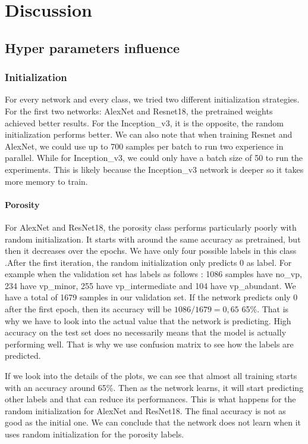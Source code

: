 \chapter{Discussion}\label{chp:discussion}
\section{Hyper parameters influence}
\subsection{Initialization}

For every network and every class, we tried two different initialization strategies. For the first two networks: AlexNet and Resnet18, the pretrained weights achieved better results. For the Inception\_v3, it is the opposite, the random initialization performs better. 
We can also note that when training Resnet and AlexNet, we could use up to 700 samples per batch to run two experience in parallel. While for Inception\_v3, we could only have a batch size of 50 to run the experiments. This is likely because the Inception\_v3  network is deeper so it takes more memory to train.


\subsubsection{Porosity}
For AlexNet and ResNet18, the porosity class performs particularly poorly with random initialization. It starts with around the same accuracy as pretrained, but then it decreases over the epochs. We have only four possible labels in this class .After the first iteration, the random initialization only predicts 0 as label. 
For example when the validation set has labels as follows : 1086 samples have no\_vp, 234 have vp\_minor, 255 have vp\_intermediate and 104 have vp\_abundant. We have a total of 1679 samples in our validation set. If the network predicts only 0 after the first epoch, then its accuracy will be \(1086/1679 = 0,65\) 65\%. That is why we have to look into the actual value that the network is predicting.  High accuracy on the test set does no necessarily means that the model is actually performing well. That is why we use confusion matrix to see how the labels are predicted.

If we look into the details of the plots, we can see that almost all training starts with an accuracy around 65\%. Then as the network learns, it will start predicting other labels and that can reduce its performances. This is what happens for the random initialization for AlexNet and ResNet18. The final accuracy is not as good as the initial one. We can conclude that the network does not learn when it uses random initialization for the porosity labels.

